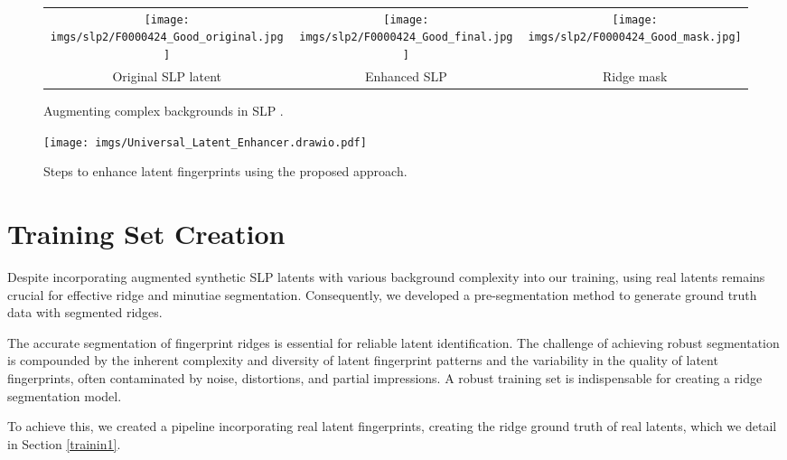 \documentclass[twocolumn, switch]{article} %
\begin{document}
\begin{figure}[H]
\centering
    \setlength{\tabcolsep}{1pt}
            \begin{tabular}{ccc}

            \texttt{[image: imgs/slp2/F0000424\_Good\_original.jpg]}&
            \texttt{[image: imgs/slp2/F0000424\_Good\_final.jpg]}&
            \texttt{[image: imgs/slp2/F0000424\_Good\_mask.jpg]}\\

            \footnotesize Original SLP latent & \footnotesize Enhanced SLP & \footnotesize Ridge mask
            
            \end{tabular}
            \caption{Augmenting complex backgrounds in SLP \cite{Wyzykowski_2023_WACV}.}
            \label{slp_exemples}
            \vspace{-0.5cm}
\end{figure}

\begin{figure*}[h]
   \centering
     \texttt{[image: imgs/Universal\_Latent\_Enhancer.drawio.pdf]}
    \caption{Steps to enhance latent fingerprints using the proposed approach.}
    \label{Flowchart}
    \vspace{-0.3cm}
\end{figure*}

\section{Training Set Creation}

Despite incorporating augmented synthetic SLP latents with various background complexity into our training, using real latents remains crucial for effective ridge and minutiae segmentation. Consequently, we developed a pre-segmentation method to generate ground truth data with segmented ridges.

The accurate segmentation of fingerprint ridges is essential for reliable latent identification. The challenge of achieving robust segmentation is compounded by the inherent complexity and diversity of latent fingerprint patterns and the variability in the quality of latent fingerprints, often contaminated by noise, distortions, and partial impressions. A robust training set is indispensable for creating a ridge segmentation model.

To achieve this, we created a pipeline incorporating real latent fingerprints, creating the ridge ground truth of real latents, which we detail in Section \ref{trainin1}. 
\end{document}
